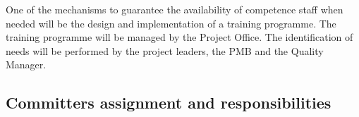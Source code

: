 \documentclass{template/openetcs_article}
\begin{document}
One of the mechanisms to guarantee the availability of competence staff when needed will be the design and implementation of a training programme. The training programme will be managed by the Project Office. The identification of needs will be performed by the project leaders, the PMB and the Quality Manager. 



\subsection{Committers assignment and responsibilities}




\end{document}

